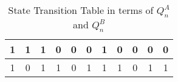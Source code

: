\begin{table}[ht!]
\begin{tabular}{|cc||cccc||cccc||c|}
    1                                                    & 1                                                    & 1           & \multicolumn{1}{c|}{0}           & 0            & 0           & 1     & \multicolumn{1}{c|}{0}     & 0            & 0           & 0                                                                   \\ \hline
    1                                                    & 0                                                    & 1           & \multicolumn{1}{c|}{1}           & 0            & 1           & 1     & \multicolumn{1}{c|}{1}     & 0            & 1           & 1                                                                   \\ \hline
    \end{tabular}
    \caption{State Transition Table in terms of $Q^A_n$ and $Q^B_n$} \label{tab:state_transition_table_2}
    \end{table}